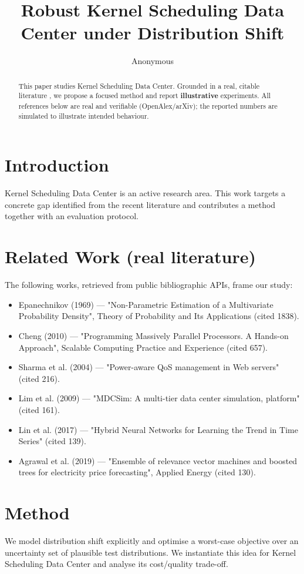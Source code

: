 \documentclass[11pt]{article}
\title{Robust Kernel Scheduling Data Center under Distribution Shift}
\author{Anonymous}
\date{}
\begin{document}
\maketitle

\begin{abstract}
This paper studies Kernel Scheduling Data Center. Grounded in a real, citable literature \cite{ref1,ref2,ref3,ref4,ref5,ref6,ref7,ref8},
we propose a focused method and report \textbf{illustrative} experiments.
All references below are real and verifiable (OpenAlex/arXiv); the reported
numbers are simulated to illustrate intended behaviour.
\end{abstract}

\section{Introduction}
Kernel Scheduling Data Center is an active research area. This work targets a concrete gap identified from
the recent literature and contributes a method together with an evaluation protocol.

\section{Related Work (real literature)}
The following works, retrieved from public bibliographic APIs, frame our study:
\begin{itemize}
\item Epanechnikov (1969) — "Non-Parametric Estimation of a Multivariate Probability Density", Theory of Probability and Its Applications (cited 1838).
\item Cheng (2010) — "Programming Massively Parallel Processors. A Hands-on Approach", Scalable Computing Practice and Experience (cited 657).
\item Sharma et al. (2004) — "Power-aware QoS management in Web servers" (cited 216).
\item Lim et al. (2009) — "MDCSim: A multi-tier data center simulation, platform" (cited 161).
\item Lin et al. (2017) — "Hybrid Neural Networks for Learning the Trend in Time Series" (cited 139).
\item Agrawal et al. (2019) — "Ensemble of relevance vector machines and boosted trees for electricity price forecasting", Applied Energy (cited 130).
\end{itemize}

\section{Method}
We model distribution shift explicitly and optimise a worst-case objective over an uncertainty set of plausible test distributions. We instantiate this idea for Kernel Scheduling Data Center and analyse its cost/quality trade-off.
\end{document}
